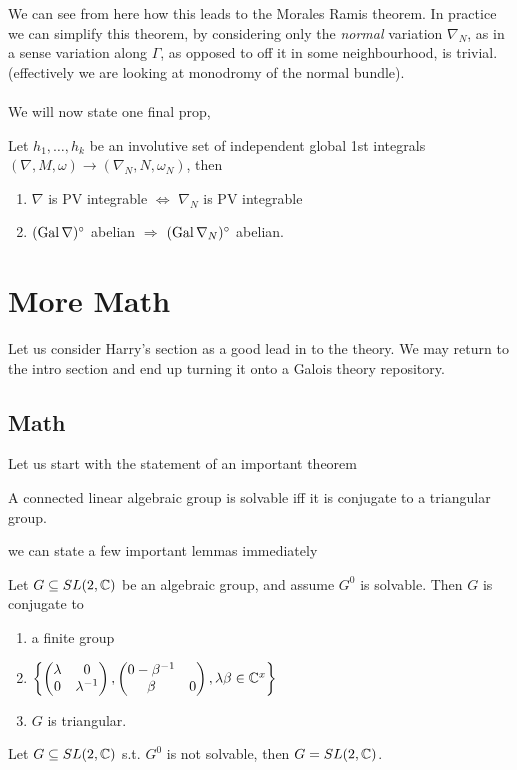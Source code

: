\documentclass{article}
\begin{document}
We can see from here how this leads to the Morales Ramis theorem. In practice we can simplify this theorem, by considering only the \textit{normal} variation $\nabla_N$, as in a sense variation along $\Gamma$, as opposed to off it in some neighbourhood, is trivial. (effectively we are looking at monodromy of the normal bundle). \\
\\
We will now state one final prop,
\begin{prop}
Let $h_1, \dots, h_k$ be an involutive set of independent global 1st integrals $(\nabla,M,\omega) \to (\nabla_N,N,\omega_N)$, then 
\begin{enumerate}
    \item $\nabla$ is PV integrable $\Leftrightarrow$ $\nabla_N$ is PV integrable
    \item $(\operatorname{Gal}\nabla)^\circ$ abelian $\Rightarrow$ $(\operatorname{Gal}\nabla_N)^\circ$ abelian. 
\end{enumerate}
\end{prop}
\section{More Math}
Let us consider Harry's section as a good lead in to the theory. We may return to the intro section and end up turning it onto a Galois theory repository. 
\subsection{Math}
Let us start with the statement of an important theorem 

\begin{theorem}
A connected linear algebraic group is solvable iff it is conjugate to a triangular group.
\end{theorem}

we can state a few important lemmas immediately

\begin{lemma}
Let $G\subseteq SL(2,\mathbb{C})$ be an algebraic group, and assume $G^0$ is solvable. Then $G$ is conjugate to 
\begin{enumerate}
    \item a finite group 
    \item $\left\{ \begin{pmatrix} \lambda & 0 \\ 0 & \lambda^{-1} \end{pmatrix}, \begin{pmatrix} 0 - \beta^{-1} \\ \beta & 0 \end{pmatrix} , \lambda \beta \in \mathbb{C}^{x} \right\}$ \\
    \item $G$ is triangular. 
\end{enumerate}
\end{lemma}

\begin{lemma}
Let $G\subseteq SL(2,\mathbb{C})$ s.t. $G^0$ is not solvable, then $G= SL(2,\mathbb{C})$. 
\end{lemma}


\end{document}
